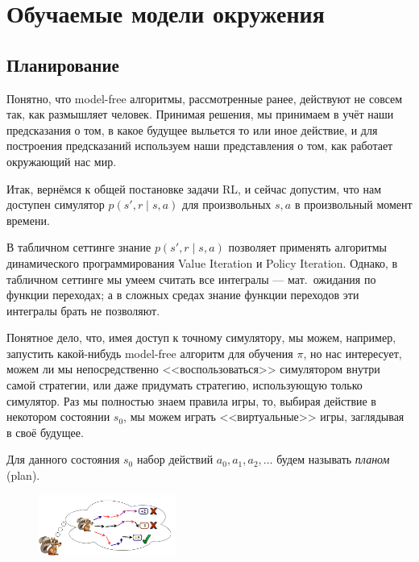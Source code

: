 \section{Обучаемые модели окружения}

\subsection{Планирование}

Понятно, что model-free алгоритмы, рассмотренные ранее, действуют не совсем так, как размышляет человек. Принимая решения, мы принимаем в учёт наши предсказания о том, в какое будущее выльется то или иное действие, и для построения предсказаний используем наши представления о том, как работает окружающий нас мир.

Итак, вернёмся к общей постановке задачи RL, и сейчас допустим, что нам доступен симулятор $p(s', r \mid s, a)$ для произвольных $s, a$ в произвольный момент времени.

В табличном сеттинге знание $p(s', r \mid s, a)$ позволяет применять алгоритмы динамического программирования Value Iteration и Policy Iteration. Однако, в табличном сеттинге мы умеем считать все интегралы --- мат.~ожидания по функции переходах; а в сложных средах знание функции переходов эти интегралы брать не позволяют.

Понятное дело, что, имея доступ к точному симулятору, мы можем, например, запустить какой-нибудь model-free алгоритм для обучения $\pi$, но нас интересует, можем ли мы непосредственно <<воспользоваться>> симулятором внутри самой стратегии, или даже придумать стратегию, использующую только симулятор. Раз мы полностью знаем правила игры, то, выбирая действие в некотором состоянии $s_0$, мы можем играть <<виртуальные>> игры, заглядывая в своё будущее. 

\begin{definition}
Для данного состояния $s_0$ набор действий $a_0, a_1, a_2, \dots$ будем называть \emph{планом} (plan).
\end{definition}

\begin{figure}
\vspace{-0.5cm}
\centering
\includegraphics[width=0.4\textwidth]{Images/Planning.png}
\vspace{-0.5cm}
\end{figure}

